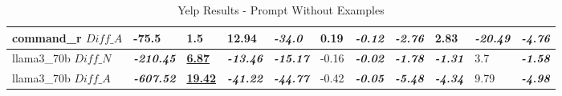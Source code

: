 \documentclass[11pt]{article}
\begin{document}
\begin{table}[ht]
{\begin{tabular}{lllllllllll}
            command\_r $Diff\_A$  & -75.5                     & 1.5                        & 12.94                    & \textbf{\textit{-34.0}}  & 0.19      & \textbf{\textit{-0.12}} & \textbf{\textit{-2.76}} & 2.83                    & \textbf{\textit{-20.49}}   & \textbf{\textit{-4.76}}  \\ \midrule
            llama3\_70b $Diff\_N$ & \textbf{\textit{-210.45}} & \textbf{\underline{6.87}}  & \textbf{\textit{-13.46}} & \textbf{\textit{-15.17}} & -0.16     & \textbf{\textit{-0.02}} & \textbf{\textit{-1.78}} & \textbf{\textit{-1.31}} & 3.7                        & \textbf{\textit{-1.58}}  \\ \midrule
            llama3\_70b $Diff\_A$ & \textbf{\textit{-607.52}} & \textbf{\underline{19.42}} & \textbf{\textit{-41.22}} & \textbf{\textit{-44.77}} & -0.42     & \textbf{\textit{-0.05}} & \textbf{\textit{-5.48}} & \textbf{\textit{-4.34}} & 9.79                       & \textbf{\textit{-4.98}}  \\ \bottomrule
        \end{tabular}%
    }
    \caption{Yelp Results - Prompt Without Examples}\label{table-prompt-1-yelp} %
\end{table}
\end{document}
